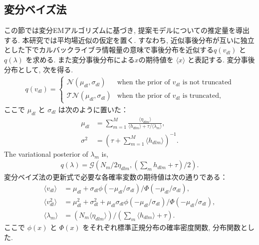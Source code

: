 \documentclass[a4paper,12ptc]{jsarticle} %
\newcommand{\normal}{\mathcal{N}}
\newcommand{\truncnorm}{\mathcal{TN}}
\newcommand{\gam}{\mathcal{G}}
\begin{document}
\subsection{変分ベイズ法}
\label{est_sec}
この節では変分EMアルゴリズム\cite{Jordan}に基づき, 提案モデルについての推定量を導出する. 
本研究では平均場近似の仮定を置く. すなわち, 近似事後分布が互いに独立とした下でカルバックライブラ情報量の意味で事後分布を近似する$q(v_{dl})$ と $q(\lambda)$ を求める. また変分事後分布による$x$の期待値を $\langle x \rangle$ と表記する.
変分事後分布として,  次を得る.
\begin{align}
q(v_{dl})= \begin{cases}
\normal(\mu_{dl}, \sigma_{dl}) & \mbox{when the prior of $v_{dl}$ is not truncated} \\
\truncnorm(\mu_{dl}, \sigma_{dl}) & \mbox{when the prior of $v_{dl}$ is truncated},     
\end{cases} \label{qv}
\end{align}
ここで $\mu_{dl}$ と $\sigma_{dl}$ は次のように置いた：
\begin{align*}
\mu_{dl} &=\sum_{m=1}^M \frac{\langle \eta_{dlm} \rangle}{\langle h_{dlm}\rangle+\tau/\langle\lambda_m\rangle},\\
\sigma^2 &=\left(\tau + \sum_{m=1}^M \langle h_{dlm} \rangle \right)^{-1}.
\end{align*}
The variational posterior of $\lambda_{m}$ is,  
\begin{align}
    q(\lambda) = \gam\left(N_m/2 \eta_{dlm}, \left(\sum_m h_{dlm}+\tau\right)/2\right). \label{qlam}
\end{align}
変分ベイズ法の更新式で必要な各確率変数の期待値は次の通りである：
\begin{align*}
\langle v_{dl}\rangle &=\mu_{dl} + \sigma_{dl} \phi(-\mu_{dl}/\sigma_{dl})/\Phi(-\mu_{dl}/\sigma_{dl}),\\
\langle v_{dl}^2 \rangle&=\mu_{dl}^2 + \sigma_{dl}^2 + \mu_{dl} \sigma_{dl} \phi(-\mu_{dl}/\sigma_{dl})/\Phi(-\mu_{dl}/\sigma_{dl}),\\
\langle \lambda_m \rangle &= (N_m \langle \eta_{dlm} \rangle ) / \left(\sum_m \langle h_{dlm} \rangle +\tau\right).
\end{align*}
ここで $\phi(x)$ と $\Phi(x)$ をそれぞれ標準正規分布の確率密度関数, 分布関数とした.
\end{document}
